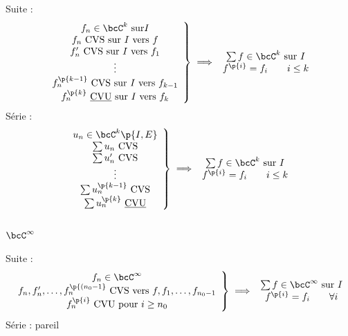 \documentclass[a4paper,french,bookmarks]{book}
\begin{document}
    Suite :
    \[\left.\begin{array}{c}
        f_n \in \bcC^k \ \text{sur} I\\
        f_n \ \text{CVS sur} \ I \ \text{vers} \ f\\
        f_n' \ \text{CVS sur} \ I \ \text{vers} \ f_1\\
        \vdots\\
        f_n^{\p{k-1}} \ \text{CVS sur} \ I \ \text{vers} \ f_{k-1}\\
        f_n^{\p{k}} \ \text{\underline{CVU} sur} \ I \ \text{vers} \ f_k
    \end{array}\right\rbrace \implies \begin{array}{c}
        \sum f \in \bcC^k \ \text{sur} \ I\\
        f^{\p{i}} = f_i \qquad i \leq k
    \end{array}\]
    Série :
    \[\left.\begin{array}{c}
        u_n \in \bcC^k\p{I, E}\\
        \sum u_n \ \text{CVS}\\
        \sum u_n' \ \text{CVS}\\
        \vdots\\
        \sum u_n^{\p{k-1}} \ \text{CVS}\\
        \sum u_n^{\p{k}} \ \text{\underline{CVU}}\\
    \end{array}\right\rbrace \implies \begin{array}{c}
        \sum f \in \bcC^k \ \text{sur} \ I\\
        f^{\p{i}} = f_i \qquad i \leq k
    \end{array}\]
    
    \subsection{$\bcC^\infty$}
    Suite :
    \[\left.\begin{array}{c}
        f_n \in \bcC^\infty\\
        f_n, f_n', \dots, f_n^{\p{(n_0 -1}} \ \text{CVS vers} \ f, f_1, \dots, f_{n_0 - 1}\\
        f_n^{\p{i}} \ \text{CVU} \ \text{pour} \ i \geq n_0
    \end{array}\right\rbrace \implies \begin{array}{c}
        \sum f \in \bcC^\infty \ \text{sur} \ I\\
        f^{\p{i}} = f_i \qquad \forall i
    \end{array}\]
    Série : pareil
    
\end{document}
